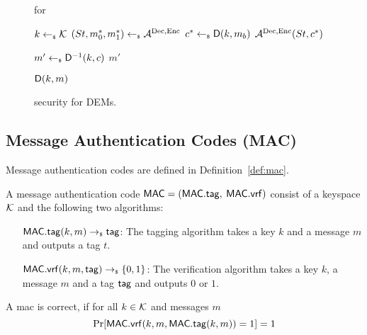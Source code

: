   \begin{figure}[!tbh]
    \begin{gamebox}{\indrcca for \dem}
      \begin{minipage}[t]{.5\linewidth}
        \begin{algorithmic}
          \State $k\gets_{\scriptscriptstyle\$} \mathcal{K}$
          \State $(St, m_0^*, m_1^*) \gets_{\scriptscriptstyle\$} \mathcal{A}_{\relax}^{\text{Dec},\text{Enc}}$
          \State $c^* \gets_{\scriptscriptstyle\$} {\mathsf{D}}(k, m_b)$
          \State \Return $\mathcal{A}_{\relax}^{\text{Dec},\text{Enc}}(St, c^*)$
        \end{algorithmic}
      \end{minipage}
    \hfill
      \begin{minipage}[t]{.48\linewidth}
        \begin{algorithmic}
          \State $m' \gets_{\scriptscriptstyle\$} {\mathsf{D}}^{-1}(k, c)$
          \State \Return {}
          \Else
          \State \Return $m'$
          \EndIf
        \end{algorithmic}
        \medskip
        \begin{algorithmic}
          \State \Return ${\mathsf{D}}(k, m)$
        \end{algorithmic}
      \end{minipage}
    \end{gamebox}
    \caption{\indrcca security for DEMs.}
    \label{fig:dem_rcca}
  \end{figure}

\subsection{Message Authentication Codes (MAC)}
Message authentication codes are defined in Definition~\ref{def:mac}.

\begin{definition}\label{def:mac}
  A message authentication code ${\mathsf{MAC}} = ({\mathsf{MAC}}.{\mathsf{tag}},$ $ {\mathsf{MAC}}.{\mathsf{vrf}})$ consist of a keyspace $\mathcal{K}$ and the following two
  algorithms:
  \begin{itemize}[align=left]
    \item[${\mathsf{MAC}}.{\mathsf{tag}}(k, m)\rightarrow_{\scriptscriptstyle\$} {\mathsf{tag}}$:] The tagging algorithm takes a key $k$ and a message $m$ and outputs
      a tag $t$.
    \item[${\mathsf{MAC}}.{\mathsf{vrf}}(k, m, {\mathsf{tag}})\rightarrow_{\scriptscriptstyle\$}\{0,1\}$:] The verification algorithm takes a key $k$, a message $m$ and
      a tag ${\mathsf{tag}}$ and outputs $0$ or $1$.
    \end{itemize}
    A mac \mac is correct, if for all $k\in\mathcal{K}$ and messages $m$
    \[
      \text{Pr}[{\mathsf{MAC}}.{\mathsf{vrf}}(k, m, {\mathsf{MAC}}.{\mathsf{tag}}(k,m)) = 1] = 1
    \]
\end{definition}

